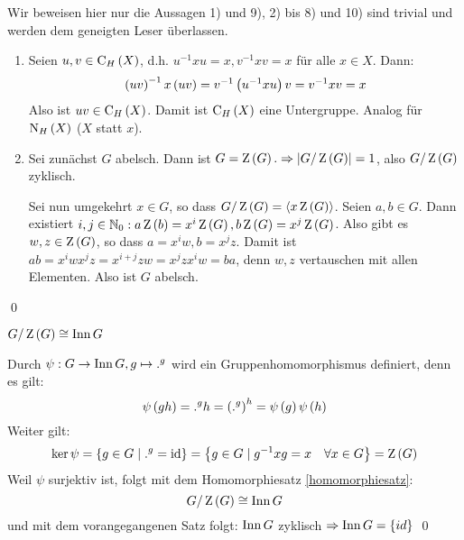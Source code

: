 \begin{beweis}
 Wir beweisen hier nur die Aussagen 1) und 9), 2) bis 8) und 10) sind trivial und werden dem geneigten Leser \"uberlassen.
 \begin{enumerate}
  \item Seien $u,v \in \operatorname{C}_H\left(X\right)$, d.h. $u^{-1}xu=x, v^{-1}xv=x$ f\"ur alle $x\in X$. Dann:
   \begin{equation*}
    \left(uv\right)^{-1}x\left(uv\right)=v^{-1}\left(u^{-1}xu\right)v=v^{-1}xv=x
   \end{equation*}
   Also ist $uv \in \operatorname{C}_H\left(X\right)$. Damit ist $\operatorname{C}_H\left(X\right)$ eine Untergruppe. Analog f\"ur $\operatorname{N}_H\left(X\right)$ ($X$ statt $x$).
  \setcounter{enumi}{8}
  \item Sei zun\"achst $G$ abelsch. Dann ist $G = \operatorname{Z}\left(G\right). \Rightarrow \left|G/\operatorname{Z}\left(G\right)\right|=1$, also $G/\operatorname{Z}\left(G\right)$ zyklisch.

   Sei nun umgekehrt $x \in G$, so dass $G/\operatorname{Z}\left(G\right) = \left< x\operatorname{Z}\left(G\right)\right>$. Seien $a, b \in G$. Dann existiert $i, j \in \mathbb{N}_0 : a\operatorname{Z}\left(b\right) = x^i\operatorname{Z}\left(G\right), b\operatorname{Z}\left(G\right) = x^j\operatorname{Z}\left(G\right)$. Also gibt es  $w, z \in \operatorname{Z}\left(G\right)$, so dass $a=x^iw, b = x^jz$. Damit ist $ab=x^iwx^jz=x^{i+j}zw=x^jzx^iw=ba$, denn $w,z$ vertauschen mit allen Elementen. Also ist $G$ abelsch.
 \end{enumerate}
 \qed
\end{beweis}

\begin{satz}
 $G/\operatorname{Z}\left(G\right) \cong \operatorname{Inn} G$
\end{satz}

\begin{beweis}
 Durch $\psi: G \to \operatorname{Inn} G, g \mapsto .^g$ wird ein Gruppenhomomorphismus definiert, denn es gilt:
 \begin{equation*}
  \psi\left(gh\right) = .^gh = \left(.^g\right)^h=\psi\left(g\right)\psi\left(h\right)
 \end{equation*}
 Weiter gilt:
 \begin{equation*}
  \ker\psi = \left\{g\in G \mid .^g = \operatorname{id}\right\}=\left\{g\in G \mid g^{-1}xg=x \quad \forall x\in G\right\}=\operatorname{Z}\left(G\right)
 \end{equation*}
 Weil $\psi$ surjektiv ist, folgt mit dem Homomorphiesatz \ref{homomorphiesatz}:
 \begin{equation*}
  G/\operatorname{Z}\left(G\right) \cong \operatorname{Inn} G
 \end{equation*}
 und mit dem vorangegangenen Satz folgt: $\operatorname{Inn} G$ zyklisch $\Rightarrow \operatorname{Inn} G=\left\{id\right\}$
 \qed
\end{beweis}

